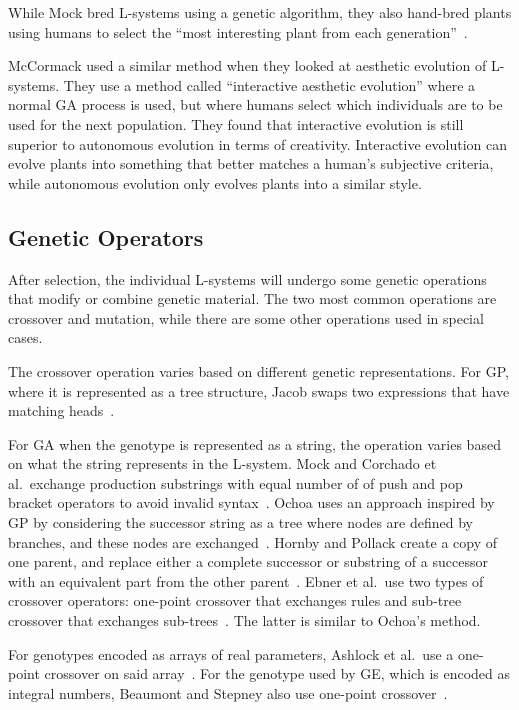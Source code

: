 While Mock bred L-systems using a genetic algorithm, they also hand-bred plants using humans to select the ``most interesting plant from each generation''~\cite{1998Mock}.

McCormack used a similar method when they looked at aesthetic evolution of L-systems.
They use a method called ``interactive aesthetic evolution'' where a normal GA process is used, but where humans select which individuals are to be used for the next population.
They found that interactive evolution is still superior to autonomous evolution in terms of creativity.
Interactive evolution can evolve plants into something that better matches a human's subjective criteria, while autonomous evolution only evolves plants into a similar style.~\cite{2004McCormack}

\subsection{Genetic Operators}
After selection, the individual L-systems will undergo some genetic operations that modify or combine genetic material.
The two most common operations are crossover and mutation, while there are some other operations used in special cases.

The crossover operation varies based on different genetic representations.
For GP, where it is represented as a tree structure, Jacob swaps two expressions that have matching heads~\cite{1994Jacob,1995Jacob}.

For GA when the genotype is represented as a string, the operation varies based on what the string represents in the L-system.
Mock and Corchado et al.\ exchange production substrings with equal number of of push and pop bracket operators to avoid invalid syntax~\cite{1998Mock,2009Corchado}.
Ochoa uses an approach inspired by GP by considering the successor string as a tree where nodes are defined by branches, and these nodes are exchanged~\cite{1998Ochoa}.
Hornby and Pollack create a copy of one parent, and replace either a complete successor or substring of a successor with an equivalent part from the other parent~\cite{2001Hornby}.
Ebner et al.\ use two types of crossover operators: one-point crossover that exchanges rules and sub-tree crossover that exchanges sub-trees~\cite{2002Ebner,2003Ebner}.
The latter is similar to Ochoa's method.

For genotypes encoded as arrays of real parameters, Ashlock et al.\ use a one-point crossover on said array~\cite{2006Ashlock}.
For the genotype used by GE, which is encoded as integral numbers, Beaumont and Stepney also use one-point crossover~\cite{2009Beaumont}.

